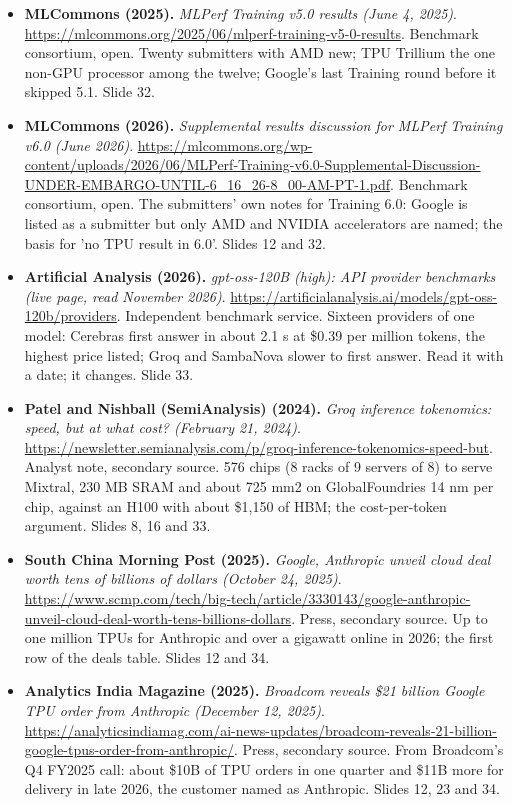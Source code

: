 \documentclass[11pt,letterpaper]{article}
\begin{document}
\begin{itemize}[leftmargin=1.2em,itemsep=3pt]
\item \textbf{MLCommons (2025).} \textit{MLPerf Training v5.0 results (June 4, 2025)}. \url{https://mlcommons.org/2025/06/mlperf-training-v5-0-results}. Benchmark consortium, open. Twenty submitters with AMD new; TPU Trillium the one non-GPU processor among the twelve; Google's last Training round before it skipped 5.1. Slide 32.
\item \textbf{MLCommons (2026).} \textit{Supplemental results discussion for MLPerf Training v6.0 (June 2026)}. \url{https://mlcommons.org/wp-content/uploads/2026/06/MLPerf-Training-v6.0-Supplemental-Discussion-UNDER-EMBARGO-UNTIL-6_16_26-8_00-AM-PT-1.pdf}. Benchmark consortium, open. The submitters' own notes for Training 6.0: Google is listed as a submitter but only AMD and NVIDIA accelerators are named; the basis for 'no TPU result in 6.0'. Slides 12 and 32.
\item \textbf{Artificial Analysis (2026).} \textit{gpt-oss-120B (high): API provider benchmarks (live page, read November 2026)}. \url{https://artificialanalysis.ai/models/gpt-oss-120b/providers}. Independent benchmark service. Sixteen providers of one model: Cerebras first answer in about 2.1 s at \$0.39 per million tokens, the highest price listed; Groq and SambaNova slower to first answer. Read it with a date; it changes. Slide 33.
\item \textbf{Patel and Nishball (SemiAnalysis) (2024).} \textit{Groq inference tokenomics: speed, but at what cost? (February 21, 2024)}. \url{https://newsletter.semianalysis.com/p/groq-inference-tokenomics-speed-but}. Analyst note, secondary source. 576 chips (8 racks of 9 servers of 8) to serve Mixtral, 230 MB SRAM and about 725 mm2 on GlobalFoundries 14 nm per chip, against an H100 with about \$1,150 of HBM; the cost-per-token argument. Slides 8, 16 and 33.
\item \textbf{South China Morning Post (2025).} \textit{Google, Anthropic unveil cloud deal worth tens of billions of dollars (October 24, 2025)}. \url{https://www.scmp.com/tech/big-tech/article/3330143/google-anthropic-unveil-cloud-deal-worth-tens-billions-dollars}. Press, secondary source. Up to one million TPUs for Anthropic and over a gigawatt online in 2026; the first row of the deals table. Slides 12 and 34.
\item \textbf{Analytics India Magazine (2025).} \textit{Broadcom reveals \$21 billion Google TPU order from Anthropic (December 12, 2025)}. \url{https://analyticsindiamag.com/ai-news-updates/broadcom-reveals-21-billion-google-tpus-order-from-anthropic/}. Press, secondary source. From Broadcom's Q4 FY2025 call: about \$10B of TPU orders in one quarter and \$11B more for delivery in late 2026, the customer named as Anthropic. Slides 12, 23 and 34.

\end{itemize}
\end{document}
